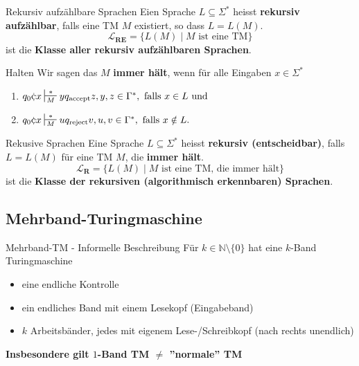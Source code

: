 \documentclass[a4paper, 11pt]{article}
\def\N{\mathbb{N}}
\begin{document}
        \begin{mainbox}{Rekursiv aufzählbare Sprachen}
            Eien Sprache $L \subseteq \Sigma^*$ heisst \textbf{rekursiv aufzählbar}, falls eine TM $M$ existiert, so dass $L = L(M)$.
            $$\mathbf{\mathcal{L}_{\textbf{RE}}} = \{L(M) \mid M \text{ ist eine TM}\}$$
            ist die \textbf{Klasse aller rekursiv aufzählbaren Sprachen}.
        \end{mainbox}
    
        \begin{subbox}{Halten}
            Wir sagen das $M$ \textbf{immer hält}, wenn für alle Eingaben $x \in \Sigma^*$
            \begin{enumerate}[label=(\roman*)]
                \item $q_0\cent x \sststile{M}{*} yq_{\text{accept}}z, y,z \in \Gamma^*, \text{ falls }x \in L \text{ und }$
                \item $q_0 \cent x \sststile{M}{*} uq_{\text{reject}}v, u,v \in \Gamma^*, \text{ falls }x \notin L.$
            \end{enumerate}
        \end{subbox}
    
        \begin{mainbox}{Rekusive Sprachen}
            Eine Sprache $L \subseteq \Sigma^*$ heisst \textbf{rekursiv (entscheidbar)}, falls $L = L(M)$ für eine TM $M$, die \textbf{immer hält}.
            $$\mathbf{\mathcal{L}_{\textbf{R}}} = \{L(M) \mid M \text{ ist eine TM, die immer hält}\}$$
            ist die \textbf{Klasse der rekursiven (algorithmisch erkennbaren) Sprachen}.
        \end{mainbox}
    
    
    
        \subsection{Mehrband-Turingmaschine}
        \begin{mainbox}{Mehrband-TM - Informelle Beschreibung}
            Für $k \in \N\setminus\{0\}$ hat eine $k$-Band Turingmaschine 
            \begin{itemize}[label=-]
                \item eine endliche Kontrolle 
                \item ein endliches Band mit einem Lesekopf (Eingabeband)
                \item $k$ Arbeitsbänder, jedes mit eigenem Lese-/Schreibkopf (nach rechts unendlich)
            \end{itemize}
        \end{mainbox}
        \textbf{Insbesondere gilt $1$-Band TM $\neq$ ''normale'' TM}
    
\end{document}
